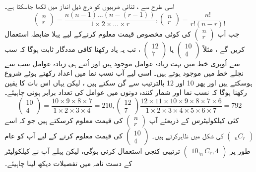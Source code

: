 اسی طرح سے ، ثنائی  ضربیوں  کو درج ذیل انداز میں لکھا جاسکتا ہے۔ 
  \[ \begin{pmatrix}
     n\\r
     \end{pmatrix}
    =\frac{n(n-1)...(n-(r-1))}{1\times2\times...\times r},
     \begin{pmatrix}
    n\\r
     \end{pmatrix}
     =\frac{n!}{r!(n-r)!}\]
جب آپ
    \(\begin{pmatrix}
     n\\r
     \end{pmatrix}\)
کی کوئی مخصوص قیمت معلوم کرنےکے لیے پہلا ضابطہ  استعمال کریں گے ، مثلاً
\(  \begin{pmatrix}
     10\\4
     \end{pmatrix}\)
 یا   
    \( \begin{pmatrix}
     12\\7
     \end{pmatrix}\)
، تب یہ یاد رکھنا کافی مددگار ثابت ہوگا کہ سب سے اُوپری خط میں بہت زیادہ عوامل موجود ہیں اور اُتنے ہی زیادہ عوامل سب سے نچلے خط میں موجود ہوتے ہیں۔  اسی لیے آپ نسب نما میں اعداد رکھتے ہوئے شروع ہوسکتے ہیں اور پھر 
10
  اور 
12
بالترتیب سے گن سکتے ہیں ، لیکن یہاں اس بات کا یقین رکھنا ہوگا کہ نسب نما اور شمار کنندہ دونوں میں عوامل کی تعداد برابر ہونی چاہیئے۔  
 \[ \begin{pmatrix}
     10\\4
     \end{pmatrix}
     =\frac{10\times9\times8\times7}{1\times2\times3\times4}=210,
     \begin{pmatrix}
     12\\7
     \end{pmatrix}
     \frac{12\times11\times10\times9\times8\times7\times6}{1\times2\times3\times4\times5\times6\times7}=792\]
کئی  کیلکولیٹرس    کے ذریعئے آپ  
    \(\begin{pmatrix}
     n\\r
     \end{pmatrix}\)
 کی قیمت  معلوم کرسکتے ہیں  جو کہ اسے 
 \(\begin{pmatrix}
 _{n}C_{r}
 \end{pmatrix}\)
کی شکل میں ظاہرکرتے ہیں۔   
\( \begin{pmatrix}
    10\\4
     \end{pmatrix}\)
  کی قیمت معلوم کرنے کے لیے آپ کو عام طور پر
\(\begin{pmatrix}
10,_{n}C_{r},4
\end{pmatrix}\)
ترتیبی کنجی استعمال کرنی ہوگی، لیکن پہلے آپ نے کیلکولیٹر کے    دست نامہ    میں تفصیلات دیکھ لینا چاہیئے۔ 

